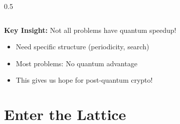\documentclass[aspectratio=169,10pt]{beamer}
\newcommand{\teaching}[1]{}
\theoremstyle{plain}
\begin{document}
\begin{frame}
\begin{columns}[T]
\begin{column}{0.5\textwidth}
    \end{column}
  \end{columns}
  
  \vspace{0.5cm}
  
  \begin{redBox}
    \textbf{Key Insight:} Not all problems have quantum speedup!
    \begin{itemize}
      \item Need specific structure (periodicity, search)
      \item Most problems: No quantum advantage
      \item This gives us hope for post-quantum crypto!
    \end{itemize}
  \end{redBox}
  
  \teaching{Transition to quantum-resistant problems}
\end{frame}


\section{Enter the Lattice}
\end{document}
